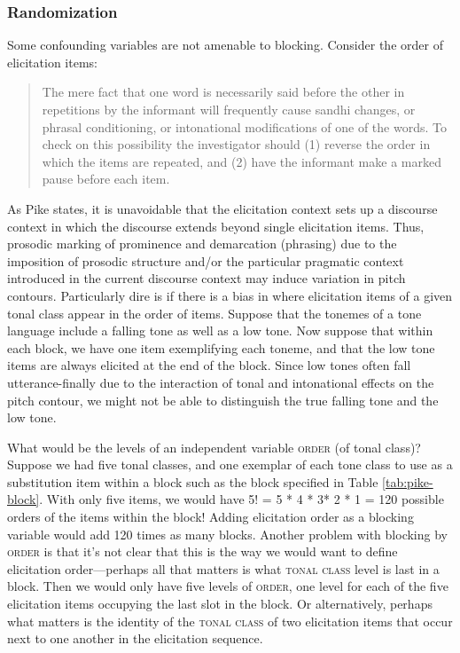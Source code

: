 \documentclass[12pt]{article}
\begin{document}
\subsubsection{Randomization}
\label{sec:randomization}

Some confounding variables are not amenable to blocking. Consider the
order of elicitation items:

\begin{quote}  
\textsf{\small{The mere fact that one word is necessarily said before the
  other in repetitions by the informant will frequently cause
  sandhi changes, or phrasal conditioning, or intonational
  modifications of one of the words. To check on this possibility
  the investigator should (1) reverse the order in which the
  items are repeated, and (2) have the informant make a marked
  pause before each item. \citep[p.\ 54]{Pike:1948}}}
\end{quote}

As Pike states, it is unavoidable that the elicitation context sets up
a discourse context in which the discourse extends beyond single
elicitation items. Thus, prosodic marking of prominence and
demarcation (phrasing) due to the imposition of prosodic structure
and/or the particular pragmatic context introduced in the current
discourse context may induce variation in pitch contours. Particularly
dire is if there is a bias in where elicitation items of a given tonal
class appear in the order of items. Suppose that the tonemes of a tone
language include a falling tone as well as a low tone. Now suppose
that within each block, we have one item exemplifying each toneme, and
that the low tone items are always elicited at the
end of the block. Since low tones often fall utterance-finally due to
the interaction of tonal and intonational effects on the pitch
contour, we might not be able to distinguish the true falling tone and
the low tone.  

 What would be the levels of an independent variable \textsc{order}
 (of tonal class)? Suppose we had five tonal classes, and one exemplar of each
tone class to use as a substitution item within a block such as the
block specified in Table \ref{tab:pike-block}. With only five items, we
would have 5! = 5 * 4 * 3* 2 * 1 = 120 possible orders of the items within the block!
Adding elicitation order as a blocking variable would add 120 times as
many blocks. Another problem with blocking by \textsc{order} is that it's
not clear that this is the way we would want to define elicitation
order---perhaps all that matters is what \textsc{tonal class} level is last in a
block. Then we would only have five levels of \textsc{order}, one
level for each of the five elicitation items occupying the last slot in
the block. Or alternatively, perhaps what matters is the identity of
the \textsc{tonal class} of two elicitation items that occur next to one another in the elicitation
sequence.  
\end{document}
